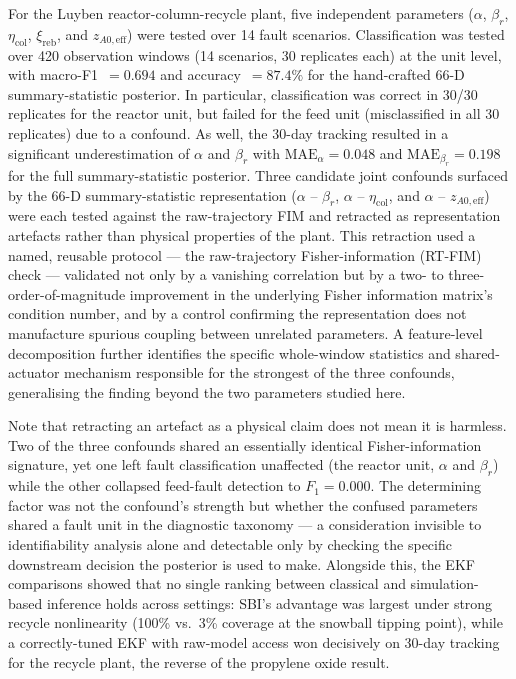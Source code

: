 \documentclass[aps,pre,twocolumn,superscriptaddress]{revtex4-2}
\begin{document}
For the Luyben reactor-column-recycle
plant, five independent parameters 
($\alpha$, $\beta_r$, $\eta_\mathrm{col}$, $\xi_\mathrm{reb}$, and 
$z_{A0,\mathrm{eff}}$) were tested over 14 fault scenarios.
Classification was tested over 420 observation windows (14 scenarios, 30 replicates each)
at the unit level, with macro-F1~$=0.694$ and accuracy~$=87.4\%$ for the 
hand-crafted 66-D summary-statistic posterior.
In particular, classification was correct in 30/30 replicates for the reactor unit,
but failed for the feed unit (misclassified in all 30 replicates) due to a
confound. As well, the 30-day tracking resulted in a significant underestimation
of $\alpha$ and $\beta_r$ with $\mathrm{MAE}_\alpha = 0.048$ and
$\mathrm{MAE}_{\beta_r} = 0.198$ for the full summary-statistic posterior.
Three candidate joint
confounds surfaced by the 66-D summary-statistic representation
($\alpha$ -- $\beta_r$, $\alpha$ -- $\eta_\mathrm{col}$, and $\alpha$ -- $z_{A0,\mathrm{eff}}$)
were each tested against the raw-trajectory FIM and retracted as representation
artefacts rather than physical properties of the plant.
This retraction used a named, reusable protocol --- the raw-trajectory
Fisher-information (RT-FIM) check --- validated not only by a vanishing
correlation but by a two- to three-order-of-magnitude improvement in the
underlying Fisher information matrix's condition number, and by a control
confirming the representation does not manufacture spurious coupling
between unrelated parameters.  A feature-level decomposition further
identifies the specific whole-window statistics and shared-actuator
mechanism responsible for the strongest of the three confounds,
generalising the finding beyond the two parameters studied here.

Note that retracting an artefact as a physical claim does not mean it is harmless.
Two of the three
confounds shared an essentially identical Fisher-information signature, yet
one left fault classification unaffected (the reactor unit, $\alpha$ and
$\beta_r$) while the other collapsed feed-fault detection to $F_1=0.000$.
The determining factor was not the
confound's strength but whether the confused parameters shared a fault unit
in the diagnostic taxonomy --- a consideration invisible to identifiability
analysis alone and detectable only by checking the specific downstream
decision the posterior is used to make. Alongside this, the EKF comparisons
showed that no single ranking between classical and simulation-based
inference holds across settings: SBI's advantage was largest under strong
recycle nonlinearity (100\% vs.\ 3\% coverage at the snowball tipping point),
while a correctly-tuned EKF with raw-model access won decisively on 30-day
tracking for the recycle plant, the reverse of the propylene oxide result.
\end{document}

